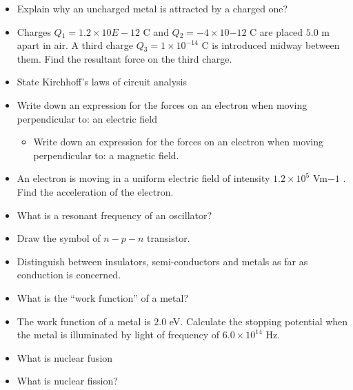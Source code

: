 \documentclass{article}
\begin{document}
\begin{itemize}
\item Explain why an uncharged metal is attracted by a charged one?
\item Charges $ Q​_{1}=1.2 \times 10$ ​$ E-12$ C and $ Q​_{2}=-4 \times 10$ ​ $ -12$ C are placed $ 5.0$ m apart in air. A third charge $ Q​_{3}=1 \times 10^{-14}$ C is introduced midway between them. Find the resultant force on the third charge.
\item State Kirchhoff’s laws of circuit analysis
\item Write down an expression for the forces on an electron when moving perpendicular to: an electric field
 \begin{itemize}
\item Write down an expression for the forces on an electron when moving perpendicular to: a magnetic field.
\end{itemize}
\item An electron is moving in a uniform electric field of intensity $ 1.2 \times 10^5$ Vm​ $ -1$ .  Find the acceleration of the electron.
\item What is a resonant frequency of an oscillator?
\item Draw the symbol of $ n-p-n$ transistor.
\item Distinguish between insulators, semi-conductors and metals as far as conduction is concerned.
\item What is the “work function” of a metal?
\item The work function of a metal is $ 2.0$ eV. Calculate the stopping potential when the metal is illuminated by light of frequency of $ 6.0 \times 10^{14}$ Hz.
\item What is nuclear fusion 
\item What is nuclear fission?
\end{itemize}
\end{document}
